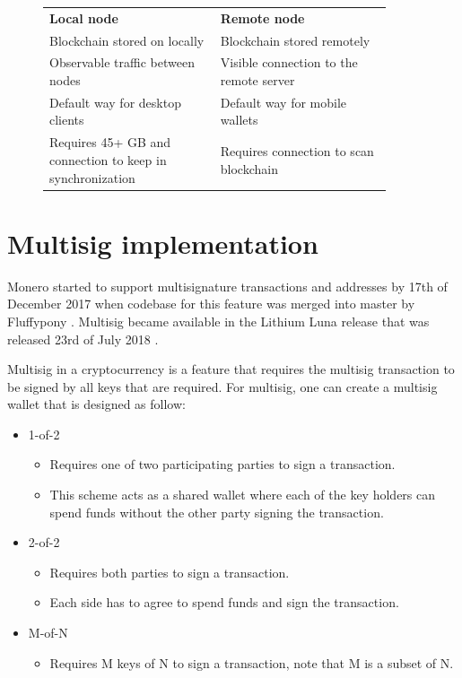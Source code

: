 \documentclass[
  printed, %
  table,   %
  lof,     %
  lot,     %
           oneside, color
]{fithesis3}
\begin{document}
\begin{figure}[H]
\center
\begin{tabular}{p{0.45\linewidth}p{0.45\linewidth}}
\textbf{Local node}                                                          & \textbf{Remote node}                                \\
Blockchain stored on locally                                           & Blockchain stored remotely                          \\
Observable traffic between nodes                                             & Visible connection to the remote server                 \\
Default way for desktop clients                                              & Default way for mobile wallets \\
Requires 45+ GB and connection to keep in synchronization                               & Requires connection to scan blockchain             
\end{tabular}
\label{table:moneronodes}
\end{figure}
\newpage
\section{Multisig implementation}

Monero started to support multisignature transactions and addresses by 17th of December 2017 when codebase for this feature was merged into master by Fluffypony \cite{moneromultisig}. Multisig became available in the Lithium Luna release that was released 23rd of July 2018 \cite{moneromultisigrelease}.

Multisig in a cryptocurrency is a feature that requires the multisig transaction to be signed by all keys that are required. For multisig, one can create a multisig wallet that is designed as follow:
\begin{itemize}\itemsep0em
\item 1-of-2 
\begin{itemize}\itemsep0em \item Requires one of two participating parties to sign a transaction. \item This scheme acts as a shared wallet where each of the key holders can spend funds without the other party signing the transaction. \end{itemize}
\item 2-of-2 \begin{itemize}\itemsep0em \item  Requires both parties to sign a transaction. \item Each side has to agree to spend funds and sign the transaction.\end{itemize}
\item M-of-N \begin{itemize}\itemsep0em \item  Requires M keys of N to sign a transaction, note that M is a subset of N. \end{itemize}
\end{itemize}
\end{document}
